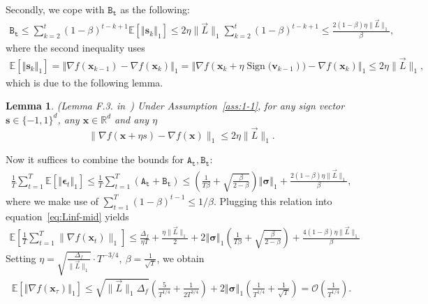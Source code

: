 \documentclass{article}
\def\eqref#1{equation~\ref{#1}}
\def\eps{{\epsilon}}
\newcommand{\E}{\mathbb{E}}
\newcommand{\R}{\mathbb{R}}
\DeclareMathOperator{\sign}{sign}
\newtheorem{lemma}[theorem]{Lemma}
\def \bsigma {\bm{\sigma}}
\def \E {\mathbb{E}}
\def \R {\mathbb{R}}
\def \v {\mathbf{v}}
\def \x {\mathbf{x}}
\def \sign  {\operatorname{Sign}}
\newcommand{\norm}[1]{\left\Vert#1\right\Vert}
\def \eps {\bm{\epsilon}}
\def \bsigma {\bm{\sigma}}
\newcommand{\sqbrac}[1]{\left[#1\right]}
\newcommand{\brac}[1]{\left(#1\right)}
\def \E {\mathbb{E}}
\def \x {\mathbf{x}}
\def \v {\mathbf{v}}
\def \R {\mathbb{R}}
\def \s {\mathbf{s}}
\begin{document}
Secondly, we cope with $\mathtt{B_t}$ as the following:
\begin{align*}
        \mathtt{B_t}\le \sum_{k=2}^t(1-\beta)^{t-k+1}\E\sqbrac{\norm{\s_k}_1}\le 2\eta \|\vec L\|_1 \sum_{k=2}^t(1-\beta)^{t-k+1}\le \frac{2(1-\beta)\eta \|\vec L\|_1}{\beta},
    \end{align*}
    where the second inequality uses \begin{align*}
    \E\sqbrac{\norm{\s_k}_1} = \norm{\nabla f(\x_{k-1})-\nabla f(\x_k)}_1 = \norm{\nabla f(\x_{k}+\eta \sign{(\v_{k-1}}))-\nabla f(\x_k)}_1\leq 2\eta \|\vec L\|_1,
\end{align*}
which is due to the following lemma.
\begin{lemma}(Lemma F.3. in~\citet{pmlr-v80-bernstein18a})
    Under Assumption~\ref{ass:1-1}, for any sign vector $\s\in \{-1,1\}^d$, any $\x\in\R^d$ and any $\eta$
$$
\| \nabla f(\x+\eta s) - \nabla f(\x)\|_1 \leq 2\eta \|\vec L\|_1.
$$
\end{lemma}
Now it suffices to combine the bounds for $\mathtt{A_t},\mathtt{B_t}$:
    \begin{align*}
        \frac{1}{T}\sum_{t=1}^T\E\sqbrac{\norm{\eps_t}_1}\le\frac{1}{T}\sum_{t=1}^T\brac{\mathtt{A_t}+\mathtt{B_t}}\le\brac{\frac{1}{T\beta}+\sqrt{\frac{\beta}{2-\beta}}}\norm{\bsigma}_1+\frac{2(1-\beta)\eta \|\vec L\|_1}{\beta},
    \end{align*}
    where we make use of $\sum_{t=1}^T(1-\beta)^{t-1}\le1/\beta$.
Plugging this relation into \eqref{eq:Linf-mid} yields
    \begin{align*}
       \E\left[\frac{1}{T}\sum_{t=1}^{T} \|\nabla f(\x_t)\|_1\right] 
        \leq \frac{\Delta_f}{\eta T} + \frac{\eta \|\vec L\|_1 }{2}+2\norm{\bsigma}_1\brac{\frac{1}{T\beta}+\sqrt{\frac{\beta}{2-\beta}}}+\frac{4(1-\beta)\eta \|\vec L\|_1}{\beta}
    \end{align*}
Setting $\eta=\sqrt{\frac{\Delta_f}{\|\vec L\|_1}}\cdot T^{-3/4},\ \beta=\frac{1}{\sqrt{T}}$, we obtain
    \begin{align*}
        \E\sqbrac{\norm{\nabla f(\x_\tau)}_1}\le \sqrt{\|\vec L\|_1 \Delta_f}\brac{\frac{5}{T^{1/4}}+\frac{1}{2T^{3/4}}}+2\norm{\bsigma}_1\brac{\frac{1}{T^{1/4}}+\frac{1}{\sqrt{T}}}=\mathcal{O}\brac{\frac{1}{T^{1/4}}}.
    \end{align*}
\end{document}
